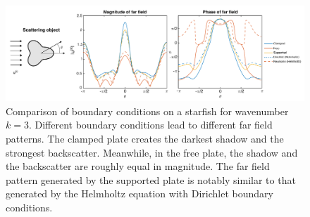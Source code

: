 \documentclass[preprint,12pt,3p]{elsarticle}
\begin{document}
\begin{figure}[ht]
\hspace{-1cm}\includegraphics[scale=0.5]{far_field_starfish3arm_1_edited.pdf}
\caption{Comparison of boundary conditions on a starfish for wavenumber $k = 3$. Different boundary conditions lead to different far field patterns. The clamped plate creates the darkest shadow and the strongest backscatter. Meanwhile, in the free plate, the shadow and the backscatter are roughly equal in magnitude. The far field pattern generated by the supported plate is notably similar to that generated by the Helmholtz equation with Dirichlet boundary conditions.   }\label{farfield1}
\end{figure}
\end{document}
